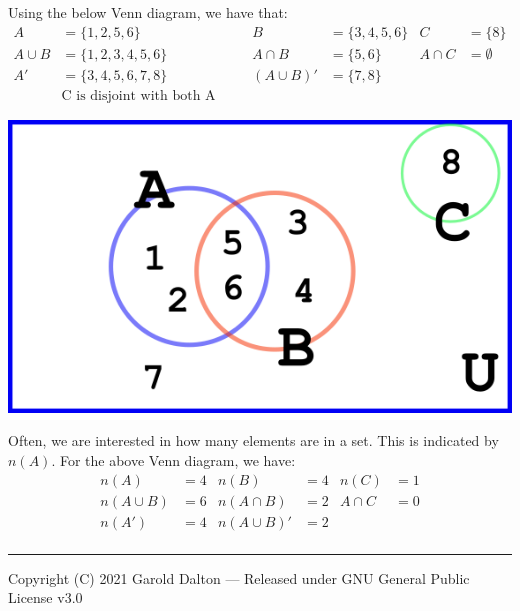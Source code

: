 \documentclass[14pt]{extarticle}
\begin{document}
Using the below Venn diagram, we have that:
\begin{align*}
	A &= \{1,2,5,6\} &  B&= \{3,4,5,6\}  & C &= \{8\}\\
	A \cup B &= \{1,2,3,4,5,6\} & A \cap B&= \{5,6\} & A \cap C &= \emptyset\\
	A' &= \{3,4,5,6,7,8\} & (A\cup B)' &= \{7,8\} & & \\
	&\text{C is disjoint with both A and B}
\end{align*}
\begin{center}
	\includegraphics[width=0.5\linewidth]{venn-2}
\end{center}
Often, we are interested in how many elements are in a set. This is indicated by $n(A)$. For the above Venn diagram, we have:
\begin{align*}
	n(A) &= 4  & n(B)&= 4  & n(C) &= 1 \\
	n(A \cup B) &= 6 & n(A \cap B)&= 2 & A \cap C &= 0 \\
	n(A') &= 4 & n(A\cup B)' &= 2 & & \\
\end{align*}

\noindent\rule{\textwidth}{1pt}
{\footnotesize Copyright (C) 2021 Garold Dalton --- Released under GNU General Public License v3.0}


\cleardoublepage
\end{document}
